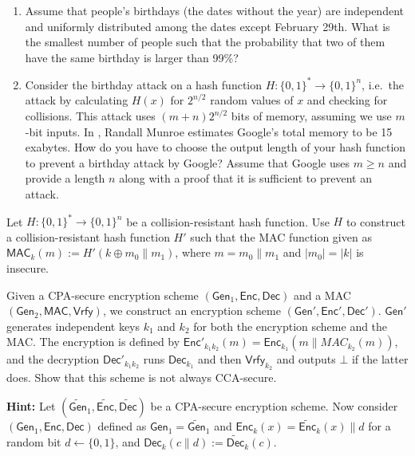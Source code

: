 \documentclass[a4paper,10pt,landscape,twocolumn]{scrartcl}
\begin{document}
\begin{exercise}
\begin{enumerate}
	\item Assume that people's birthdays (the dates without the year) are independent and uniformly distributed among the dates except February 29th. What is the smallest number of people such that the probability that two of them have the same birthday is larger than 99\%?
	\item Consider the birthday attack on a hash function $H: \{0,1\}^*\to\{0,1\}^n$, i.e.\ the attack by calculating $H(x)$ for $2^{n/2}$ random values of $x$ and checking for collisions. This attack uses $(m+n)2^{n/2}$ bits of memory, assuming we use $m$-bit inputs. In , Randall Munroe estimates Google's total memory to be 15 exabytes.  How do you have to choose the output length of your hash function to prevent a birthday attack by Google? Assume that Google uses $m\ge n$ and provide a length $n$ along with a proof that it is sufficient to prevent an attack.
\end{enumerate}
\end{exercise}



\begin{exercise}[HMAC?]
  Let $H: \{0,1\}^*\to \{0,1\}^n$ be a collision-resistant hash function. Use $H$ to construct a collision-resistant hash function $H'$ such that the MAC function given as $\mathsf{MAC}_k(m) := H'(k\oplus m_0\|m_1)$, where $m=m_0\|m_1$ and $|m_0|=|k|$ is insecure.
\end{exercise}

\begin{exercise}

Given a CPA-secure encryption scheme $(\mathsf{Gen}_1, \mathsf{Enc}, \mathsf{Dec})$ and a MAC $(\mathsf{Gen}_2, \mathsf{MAC}, \mathsf{Vrfy})$, we construct an encryption scheme $(\mathsf{Gen}', \mathsf{Enc}', \mathsf{Dec}')$. $\mathsf{Gen}'$ generates independent keys $k_1$ and $k_2$ for both the encryption scheme and the MAC. The encryption is defined by $\mathsf{Enc}'_{k_1k_2}(m)=\mathsf{Enc}_{k_1}(m\|MAC_{k_2}(m))$, and the decryption $\mathsf{Dec}'_{k_1k_2}$ runs $\mathsf{Dec}_{k_1}$ and then $\mathsf{Vrfy}_{k_2}$ and outputs $\bot$ if the latter does. Show that this scheme is not always CCA-secure.

\textbf{Hint:} Let $(\mathsf{\widetilde{Gen}}_1, \mathsf{\widetilde{Enc}}, \mathsf{\widetilde{Dec}})$ be a CPA-secure encryption scheme. Now consider $(\mathsf{Gen}_1, \mathsf{Enc}, \mathsf{Dec})$ defined as 
$\mathsf{Gen}_1 = \mathsf{\widetilde{Gen}}_1$ and $\mathsf{Enc}_k(x) =  \mathsf{\widetilde{Enc}}_k(x) \| d$ for a random bit $d \leftarrow \{0,1\}$, and $\mathsf{Dec}_k(c \| d) := \mathsf{\widetilde{Dec}}_k(c)$.

\end{exercise}
\end{document}
